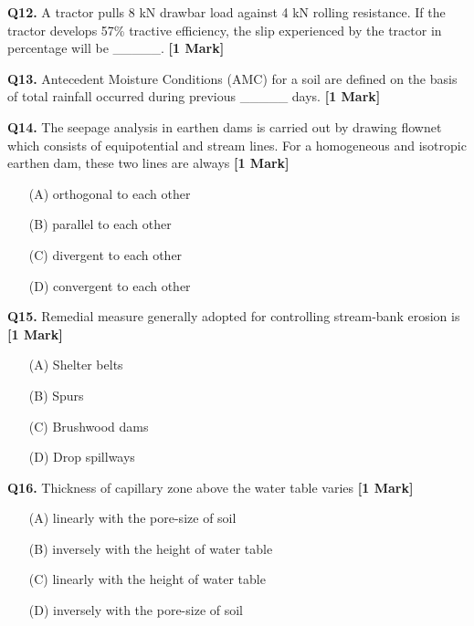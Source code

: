 \documentclass[11pt]{article}
\newcommand{\questiona}[2]{
    \noindent\textbf{Q#2.} #1 \hfill \textbf{[1 Mark]}
}
\begin{document}
\vspace{0.5cm}

\questiona{A tractor pulls 8 kN drawbar load against 4 kN rolling resistance. If the tractor develops 57\% tractive efficiency, the slip experienced by the tractor in percentage will be \_\_\_\_\_.}{12}

\vspace{0.5cm}

\questiona{Antecedent Moisture Conditions (AMC) for a soil are defined on the basis of total rainfall occurred during previous \_\_\_\_\_ days.}{13}

\vspace{0.5cm}

\questiona{The seepage analysis in earthen dams is carried out by drawing flownet which consists of equipotential and stream lines. For a homogeneous and isotropic earthen dam, these two lines are always}{14}
\begin{enumerate}
    \item[(A)] orthogonal to each other
    \item[(B)] parallel to each other
    \item[(C)] divergent to each other
    \item[(D)] convergent to each other
\end{enumerate}

\vspace{0.5cm}

\questiona{Remedial measure generally adopted for controlling stream-bank erosion is}{15}
\begin{enumerate}
    \item[(A)] Shelter belts
    \item[(B)] Spurs
    \item[(C)] Brushwood dams
    \item[(D)] Drop spillways
\end{enumerate}

\vspace{0.5cm}

\questiona{Thickness of capillary zone above the water table varies}{16}
\begin{enumerate}
    \item[(A)] linearly with the pore-size of soil
    \item[(B)] inversely with the height of water table
    \item[(C)] linearly with the height of water table
    \item[(D)] inversely with the pore-size of soil
\end{enumerate}
\end{document}
